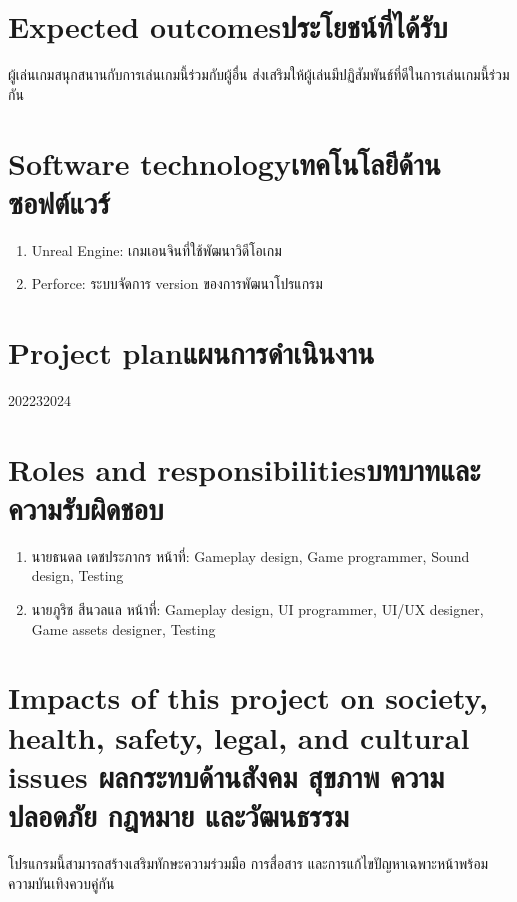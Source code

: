 \section{\ifenglish Expected outcomes\else ประโยชน์ที่ได้รับ\fi}

ผู้เล่นเกมสนุกสนานกับการเล่นเกมนี้ร่วมกับผู้อื่น ส่งเสริมให้ผู้เล่นมีปฏิสัมพันธ์ที่ดีในการเล่นเกมนี้ร่วมกัน

\section{\ifenglish Software technology\else เทคโนโลยีด้านซอฟต์แวร์\fi}
\begin{enumerate}
    \item Unreal Engine: เกมเอนจินที่ใช้พัฒนาวิดีโอเกม
    \item Perforce: ระบบจัดการ version ของการพัฒนาโปรแกรม
\end{enumerate}

\section{\ifenglish Project plan\else แผนการดำเนินงาน\fi}

\begin{plan}{12}{2022}{3}{2024}
\end{plan}

\section{\ifenglish Roles and responsibilities\else บทบาทและความรับผิดชอบ\fi}
\begin{enumerate}
    \item นายธนดล เดชประภากร หน้าที่: Gameplay design, Game programmer, Sound design, Testing
    \item นายภูริช สีนวลแล หน้าที่: Gameplay design, UI programmer, UI/UX designer, Game assets designer, Testing
\end{enumerate}

\section{\ifenglish%
Impacts of this project on society, health, safety, legal, and cultural issues
\else%
ผลกระทบด้านสังคม สุขภาพ ความปลอดภัย กฎหมาย และวัฒนธรรม
\fi}

โปรแกรมนี้สามารถสร้างเสริมทักษะความร่วมมือ การสื่อสาร และการแก้ไขปัญหาเฉพาะหน้าพร้อมความบันเทิงควบคู่กัน
